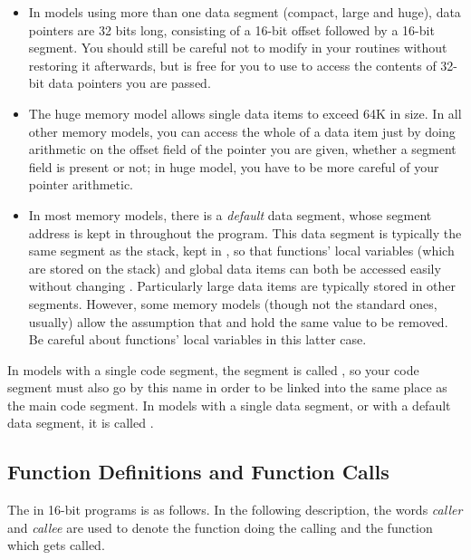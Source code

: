 \begin{itemize}
    \item{In models using more than one data segment (compact, large and
        huge), data pointers are 32 bits long, consisting of a 16-bit offset
        followed by a 16-bit segment. You should still be careful not to
        modify  in your routines without restoring it afterwards, but
         is free for you to use to access the contents of 32-bit data
        pointers you are passed.}

    \item{The huge memory model allows single data items to exceed 64K in
        size. In all other memory models, you can access the whole of a data
        item just by doing arithmetic on the offset field of the pointer you
        are given, whether a segment field is present or not; in huge model,
        you have to be more careful of your pointer arithmetic.}

    \item{In most memory models, there is a \emph{default} data segment, whose
        segment address is kept in  throughout the program. This data
        segment is typically the same segment as the stack, kept in ,
        so that functions' local variables (which are stored on the stack)
        and global data items can both be accessed easily without changing
        . Particularly large data items are typically stored in other
        segments. However, some memory models (though not the standard
        ones, usually) allow the assumption that  and  hold the
        same value to be removed. Be careful about functions' local
        variables in this latter case.}
\end{itemize}

In models with a single code segment, the segment is called ,
so your code segment must also go by this name in order to be linked into the
same place as the main code segment. In models with a single data segment,
or with a default data segment, it is called .

\subsection{Function Definitions and Function Calls}
\label{subsec:16cfunc}

The 
in 16-bit programs is as follows. In the following description, the
words \emph{caller} and \emph{callee} are used to denote the function
doing the calling and the function which gets called.

